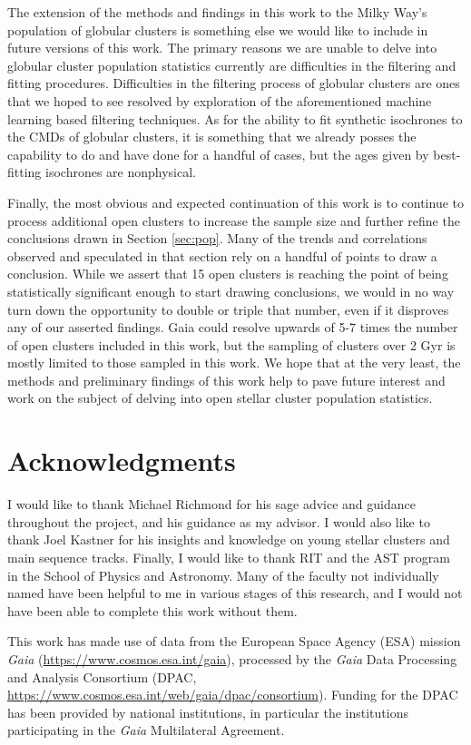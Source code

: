 \documentclass[onecolumn,table,xcdraw,super]{aastex631}
\begin{document}
The extension of the methods and findings in this work to the Milky Way's population of globular clusters is something else we would like to include in future versions of this work. The primary reasons we are unable to delve into globular cluster population statistics currently are difficulties in the filtering and fitting procedures. Difficulties in the filtering process of globular clusters are ones that we hoped to see resolved by exploration of the aforementioned machine learning based filtering techniques. As for the ability to fit synthetic isochrones to the CMDs of globular clusters, it is something that we already posses the capability to do and have done for a handful of cases, but the ages given by best-fitting isochrones are nonphysical.

Finally, the most obvious and expected continuation of this work is to continue to process additional open clusters to increase the sample size and further refine the conclusions drawn in Section \ref{sec:pop}. Many of the trends and correlations observed and speculated in that section rely on a handful of points to draw a conclusion. While we assert that 15 open clusters is reaching the point of being statistically significant enough to start drawing conclusions, we would in no way turn down the opportunity to double or triple that number, even if it disproves any of our asserted findings. Gaia could resolve upwards of 5-7 times the number of open clusters included in this work, but the sampling of clusters over 2 Gyr is mostly limited to those sampled in this work. We hope that at the very least, the methods and preliminary findings of this work help to pave future interest and work on the subject of delving into open stellar cluster population statistics.

\section{Acknowledgments}
I would like to thank Michael Richmond for his sage advice and guidance throughout the project, and his guidance as my advisor. I would also like to thank Joel Kastner for his insights and knowledge on young stellar clusters and main sequence tracks. Finally, I would like to thank RIT and the AST program in the School of Physics and Astronomy. Many of the faculty not individually named have been helpful to me in various stages of this research, and I would not have been able to complete this work without them.

This work has made use of data from the European Space Agency (ESA) mission
{\it Gaia} (\url{https://www.cosmos.esa.int/gaia}), processed by the {\it Gaia}
Data Processing and Analysis Consortium (DPAC,
\url{https://www.cosmos.esa.int/web/gaia/dpac/consortium}). Funding for the DPAC
has been provided by national institutions, in particular the institutions
participating in the {\it Gaia} Multilateral Agreement.
\end{document}
